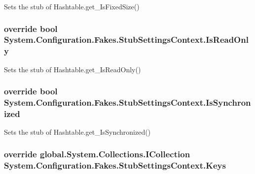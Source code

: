 Sets the stub of Hashtable.\-get\-\_\-\-Is\-Fixed\-Size()

\hypertarget{class_system_1_1_configuration_1_1_fakes_1_1_stub_settings_context_a0dd0a5e343e437ef81b0e7a763ec63f4}{
\subsubsection[{Is\-Read\-Only}]{\setlength{\rightskip}{0pt plus 5cm}override bool System.\-Configuration.\-Fakes.\-Stub\-Settings\-Context.\-Is\-Read\-Only\hspace{0.3cm}{\ttfamily [get]}}}\label{class_system_1_1_configuration_1_1_fakes_1_1_stub_settings_context_a0dd0a5e343e437ef81b0e7a763ec63f4}


Sets the stub of Hashtable.\-get\-\_\-\-Is\-Read\-Only()

\hypertarget{class_system_1_1_configuration_1_1_fakes_1_1_stub_settings_context_a4a8647b7d37f97b62913a0c78d02bc19}{
\subsubsection[{Is\-Synchronized}]{\setlength{\rightskip}{0pt plus 5cm}override bool System.\-Configuration.\-Fakes.\-Stub\-Settings\-Context.\-Is\-Synchronized\hspace{0.3cm}{\ttfamily [get]}}}\label{class_system_1_1_configuration_1_1_fakes_1_1_stub_settings_context_a4a8647b7d37f97b62913a0c78d02bc19}


Sets the stub of Hashtable.\-get\-\_\-\-Is\-Synchronized()

\hypertarget{class_system_1_1_configuration_1_1_fakes_1_1_stub_settings_context_a9b1b127ab742cb59491b2d9dbb6e78a0}{
\subsubsection[{Keys}]{\setlength{\rightskip}{0pt plus 5cm}override global.\-System.\-Collections.\-I\-Collection System.\-Configuration.\-Fakes.\-Stub\-Settings\-Context.\-Keys\hspace{0.3cm}{\ttfamily [get]}}}\label{class_system_1_1_configuration_1_1_fakes_1_1_stub_settings_context_a9b1b127ab742cb59491b2d9dbb6e78a0}


